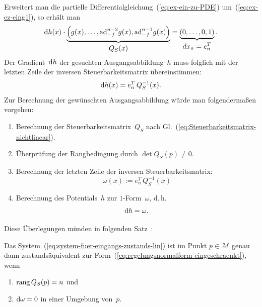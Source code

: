 Erweitert man die partielle Differentialgleichung~(\ref{eq:ex-ein-zu-PDE})
um~(\ref{eq:ex-ez-eing1}), so erhält man 
\begin{equation}
{\mathrm{d}} h(x)\cdot\underbrace{\left(g(x),\ldots,{\operatorname{ad}}_{-f}^{n-2}g(x),{\operatorname{ad}}_{-f}^{n-1}g(x)\right)}_{{\displaystyle Q_{S}(x)}}=\underbrace{\left(0,\ldots,0,1\right)}_{{\displaystyle dx_{n}=e_{n}^{T}}}.\label{eq:EZ-PDE-eingeschraenkt}
\end{equation}
Der Gradient~${\mathrm{d}} h$ der gesuchten Ausgangsabbildung~$h$ muss folglich
mit der letzten Zeile der inversen Steuerbarkeitsmatrix übereinstimmen:
\[
{\mathrm{d}} h(x)=e_{n}^{T}\,Q_{S}^{-1}(x).
\]
Zur Berechnung der gewünschten Ausgangsabbildung würde man folgendermaßen
vorgehen:
\begin{enumerate}
\item Berechnung der Steuerbarkeitsmatrix~$Q_{S}$ nach Gl.~(\ref{eq:Steuerbarkeitsmatrix-nichtlinear}).
\item Überprüfung der Rangbedingung durch $\det Q_{S}(p)\neq0$.
\item Berechnung der letzten Zeile der inversen Steuerbarkeitsmatrix: 
\begin{equation}
\omega(x):=e_{n}^{T}\,Q_{S}^{-1}(x)\label{eq:omega-letzte-Zeile-QS}
\end{equation}
\item Berechnung des Potentials~$h$ zur $1$-Form~$\omega$, d.\,h.
\begin{equation}
{\mathrm{d}} h=\omega.\label{eq:omega-dh}
\end{equation}
\end{enumerate}
Diese Überlegungen münden in folgenden Satz~\cite[Theorem~3]{dayawansa1985}:
\begin{theorem}
\label{thm:Exakte-Eingangs-Zustands-Linearisierung-eingeschraenkt}Das
System~(\ref{eq:system-fuer-eingangs-zustands-lin}) ist im Punkt
$p\in\mathcal{M}$ genau dann zustands\-äquivalent zur Form~(\ref{eq:regelungsnormalform-eingeschraenkt}),
wenn
\begin{enumerate}
\item \label{enu:exakt-restr1}${\operatorname{rang}}\,Q_{S}(p)=n$ und
\item \label{enu:exakt-restr2}${\mathrm{d}}\omega=0$ in einer Umgebung von~$p$.
\end{enumerate}
\end{theorem}
